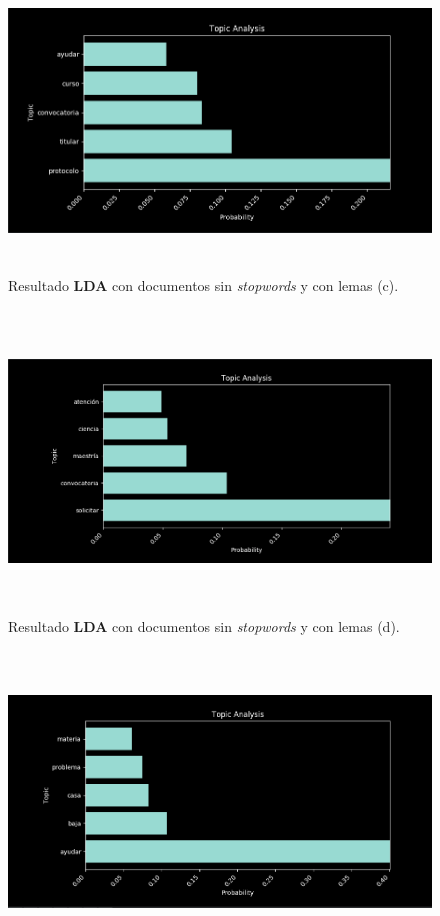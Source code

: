 \begin{itemize}
\begin{figure}[H]
            \label{fig:ns_wl-2}
        \end{figure}
        \begin{figure}[H]
            \centering
            \includegraphics[height=8cm, width=16.5cm]{Latex/Classes/Imagenes/ns_wl-3.png}
            \caption{Resultado \textbf{LDA} con documentos sin \textit{stopwords} y con lemas (c).}
            \label{fig:ns_wl-3}
        \end{figure}
        \begin{figure}[H]
            \centering
            \includegraphics[height=8cm, width=16.5cm]{Latex/Classes/Imagenes/ns_wl-4.png}
            \caption{Resultado \textbf{LDA} con documentos sin \textit{stopwords} y con lemas (d).}
            \label{fig:ns_wl-4}
        \end{figure}
        \begin{figure}[H]
            \centering
            \includegraphics[height=8cm, width=16.5cm]{Latex/Classes/Imagenes/ns_wl-5.png}

\end{figure}
\end{itemize}
